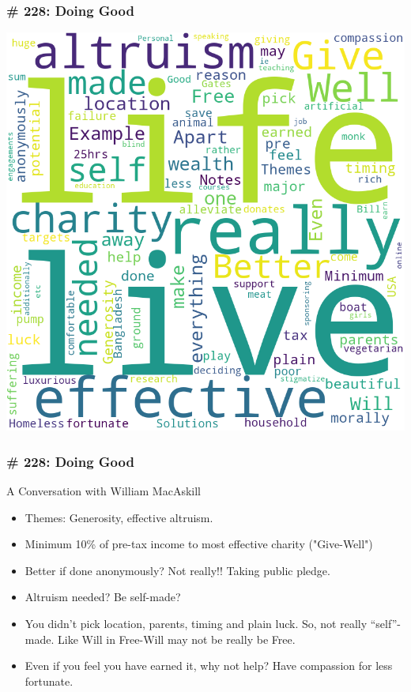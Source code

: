 \begin{frame}[fragile]
\frametitle{\# 228: Doing Good}


 \begin{center}

\includegraphics[width=0.6\linewidth,keepaspectratio]{images/Review_Podcast_MakingSense_228_DoingGood}
\end{center}

\end{frame}

\begin{frame}[fragile]
\frametitle{\# 228: Doing Good}

 A Conversation with William MacAskill

\begin{itemize}
\item Themes: Generosity, effective altruism.
\item Minimum 10\% of pre-tax income to most effective charity ("Give-Well")
\item  Better if done anonymously? Not really!! Taking public pledge.
\item  Altruism needed? Be self-made?
\item  You didn't pick location, parents, timing and plain luck. So, not really ``self''-made. Like Will in Free-Will may not be really be Free.
\item  Even if you feel you have earned it, why not help? Have compassion for less fortunate.
\end{itemize}


\end{frame}


